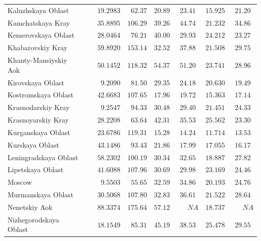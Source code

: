 \documentclass[alpha-refs]{wiley-article-05g}
\begin{document}
{\begin{longtable}{lcccccc}
Kaluzhskaya Oblast  & $\phantom{0}\phantom{-}19.2983$ & $\phantom{0}62.37$ & $20.89$ & $23.41$ & $15.925$ & $21.20$ \\
Kamchatskaya Kray  & $\phantom{0}\phantom{-}35.8895$ & $106.29$ & $39.26$ & $44.74$ & $21.232$ & $34.86$ \\
Kemerovskaya Oblast  & $\phantom{0}\phantom{-}28.0464$ & $\phantom{0}76.21$ & $40.00$ & $29.93$ & $24.212$ & $23.27$ \\
Khabarovskiy Kray  & $\phantom{0}\phantom{-}59.8920$ & $153.14$ & $32.52$ & $37.88$ & $21.508$ & $29.75$ \\
Khanty-Mansiyskiy Aok  & $\phantom{0}\phantom{-}50.1452$ & $118.32$ & $54.37$ & $51.20$ & $23.741$ & $28.96$ \\
Kirovskaya Oblast  & $\phantom{00}\phantom{-}9.2090$ & $\phantom{0}81.50$ & $29.35$ & $24.18$ & $20.630$ & $19.49$ \\
Kostromskaya Oblast  & $\phantom{0}\phantom{-}42.6683$ & $107.65$ & $17.96$ & $19.72$ & $15.363$ & $17.14$ \\
Krasnodarskiy Kray  & $\phantom{00}\phantom{-}9.2547$ & $\phantom{0}94.33$ & $30.48$ & $29.40$ & $21.451$ & $24.33$ \\
Krasnoyarskiy Kray  & $\phantom{0}\phantom{-}28.2208$ & $\phantom{0}63.64$ & $42.31$ & $35.53$ & $25.562$ & $23.30$ \\
Kurganskaya Oblast  & $\phantom{0}\phantom{-}23.6786$ & $119.31$ & $15.28$ & $14.24$ & $11.714$ & $13.53$ \\
Kurskaya Oblast  & $\phantom{0}\phantom{-}43.1486$ & $\phantom{0}93.43$ & $21.86$ & $17.99$ & $17.055$ & $16.17$ \\
Leningradskaya Oblast  & $\phantom{0}\phantom{-}58.2302$ & $100.19$ & $30.34$ & $32.65$ & $18.887$ & $27.82$ \\
Lipetskaya Oblast  & $\phantom{0}\phantom{-}41.6088$ & $107.96$ & $30.69$ & $29.98$ & $23.169$ & $24.46$ \\
Moscow  & $\phantom{00}\phantom{-}9.5503$ & $\phantom{0}55.65$ & $32.59$ & $34.86$ & $20.193$ & $24.76$ \\
Murmanskaya Oblast  & $\phantom{0}\phantom{-}30.5068$ & $107.80$ & $32.83$ & $36.61$ & $21.522$ & $28.64$ \\
Nenetskiy Aok  & $\phantom{0}\phantom{-}88.3374$ & $175.64$ & $57.12$ & $\phantom{000}NA$ & $18.737$ & $\phantom{000}NA$ \\
Nizhegorodskaya Oblast  & $\phantom{0}\phantom{-}18.1549$ & $\phantom{0}85.31$ & $45.19$ & $38.53$ & $25.478$ & $29.55$ \\

\end{longtable}}
\end{document}
